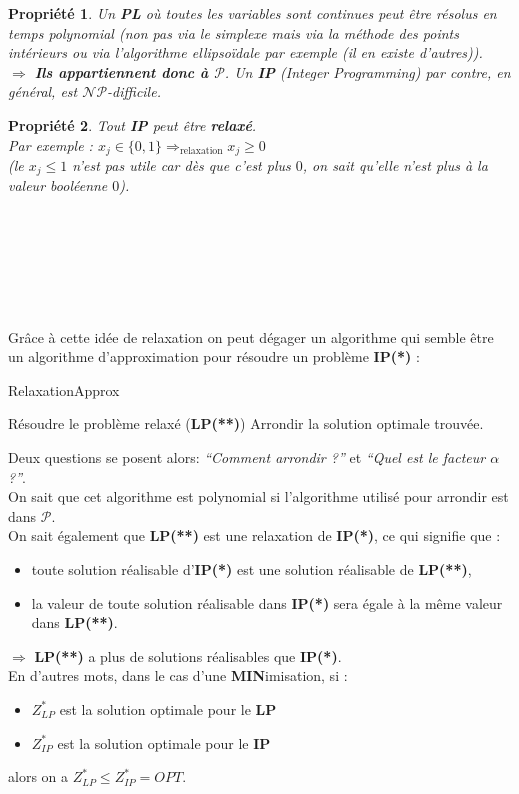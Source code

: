\documentclass{article}
\newcommand{\titre}[1]{\textcolor{title}{#1}}
\newtheorem{propriete}{Propri\'et\'e}[section]
\begin{document}
\begin{sffamily}
\begin{propriete}
Un \textbf{\titre{PL}} où toutes les variables sont continues peut être résolus
en temps polynomial (non pas via le simplexe mais via la méthode des points
intérieurs ou via l'algorithme ellipsoïdale par exemple (il en existe
d'autres)).\\
\indent $\Rightarrow$ \textbf{Ils appartiennent donc à $\mathcal{P}$}. Un
\textbf{\titre{IP}} \textit{(Integer Programming)} par contre,
en général, est $\mathcal{NP}$-\textit{difficile}.
\end{propriete}

\begin{propriete}
Tout \textbf{\titre{IP}} peut être \textbf{relaxé}. \\
Par exemple : $x_j \in \{0,1\} \Rightarrow_{\text{relaxation}} x_j \geq 0$\\
(le $x_j \leq 1$ n'est pas utile car dès que c'est plus $0$, on sait qu'elle
n'est plus à la valeur booléenne $0$).
\end{propriete}
$ $\\$ $\\$ $\\$ $\\$ $\\$ $\\

Grâce à cette idée de relaxation on peut dégager un algorithme qui semble être
un algorithme d'approximation pour résoudre un problème \textbf{IP(*)} :
\begin{algorithm}[h!]
\caption{RelaxationApprox}
\begin{algorithmic}[1]
\STATE Résoudre le problème relaxé (\textbf{LP(**)})
\STATE Arrondir la solution optimale trouvée.
\end{algorithmic}
\end{algorithm}

Deux questions se posent alors: \textit{``Comment arrondir ?''} et
\textit{``Quel est le facteur $\alpha$ ?''}.\\
On sait que cet algorithme est polynomial si l'algorithme utilisé pour arrondir
est dans $\mathcal{P}$. \\
On sait également que \textbf{LP(**)} est une relaxation de \textbf{IP(*)}, ce
qui signifie que :
\begin{itemize}
\item toute solution réalisable d'\textbf{IP(*)} est une solution réalisable de
\textbf{LP(**)},
\item la valeur de toute solution réalisable dans \textbf{IP(*)} sera égale à la
même valeur dans \textbf{LP(**)}.
\end{itemize}
$\Rightarrow$ \textbf{LP(**)} a plus de solutions réalisables que
\textbf{IP(*)}.\\
En d'autres mots, dans le cas d'une \textbf{MIN}imisation, si :
\begin{itemize}
\item $Z^*_{LP}$ est la solution optimale pour le \textbf{LP}
\item $Z^*_{IP}$ est la solution optimale pour le \textbf{IP}
\end{itemize}
alors on a $\boxed{Z^*_{LP} \leq Z^*_{IP} = OPT}$.


\end{sffamily}
\end{document}
